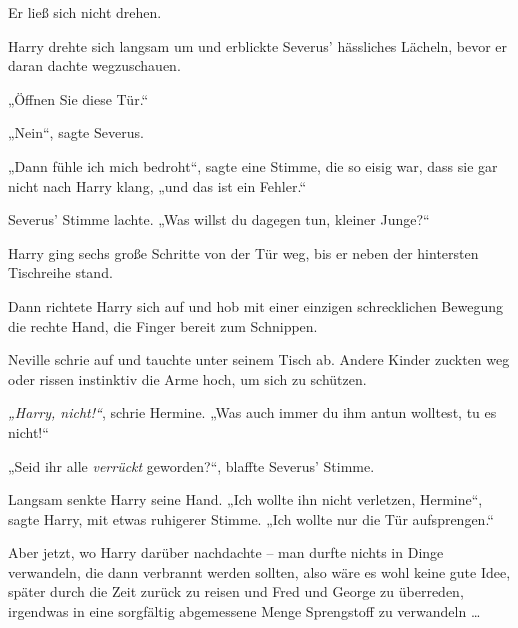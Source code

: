 Er ließ sich nicht drehen. 

Harry drehte sich langsam um und erblickte Severus’ hässliches Lächeln, bevor er daran dachte wegzuschauen. 

„Öffnen Sie diese Tür.“ 

„Nein“, sagte Severus. 

„Dann fühle ich mich bedroht“, sagte eine Stimme, die so eisig war, dass sie gar nicht nach Harry klang, „und das ist ein Fehler.“ 

Severus’ Stimme lachte. „Was willst du dagegen tun, kleiner Junge?“ 

Harry ging sechs große Schritte von der Tür weg, bis er neben der hintersten Tischreihe stand. 

Dann richtete Harry sich auf und hob mit einer einzigen schrecklichen Bewegung die rechte Hand, die Finger bereit zum Schnippen. 

Neville schrie auf und tauchte unter seinem Tisch ab. Andere Kinder zuckten weg oder rissen instinktiv die Arme hoch, um sich zu schützen. 

\emph{„Harry, nicht!“}, schrie Hermine. „Was auch immer du ihm antun wolltest, tu es nicht!“ 

„Seid ihr alle \emph{verrückt} geworden?“, blaffte Severus’ Stimme. 

Langsam senkte Harry seine Hand. „Ich wollte ihn nicht verletzen, Hermine“, sagte Harry, mit etwas ruhigerer Stimme. „Ich wollte nur die Tür aufsprengen.“ 

Aber jetzt, wo Harry darüber nachdachte – man durfte nichts in Dinge verwandeln, die dann verbrannt werden sollten, also wäre es wohl keine gute Idee, später durch die Zeit zurück zu reisen und Fred und George zu überreden, irgendwas in eine sorgfältig abgemessene Menge Sprengstoff zu verwandeln … 

